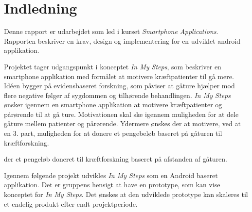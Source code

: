 \thispagestyle{fancy}
\chapter{Indledning}
\label{chp:indledning}

Denne rapport er udarbejdet som led i kurset \emph{Smartphone Applications}. Rapporten beskriver en krav, design og implementering for en udviklet android applikation.

Projektet tager udgangspunkt i konceptet \emph{In My Steps}, som beskriver en smartphone applikation med formålet at motivere kræftpatienter til gå mere. Idéen bygger på evidensbaseret forskning, som påviser at gåture hjælper mod flere negative følger af sygdommen og tilhørende behandlingen. 
\emph{In My Steps} ønsker igennem en smartphone applikation at motivere kræftpatienter og pårørende til at gå ture. Motivationen skal ske igennem muligheden for at dele gåture mellem patienter og pårørende. Ydermere ønskes der at motivere, ved at en 3. part, muligheden for at donere et pengebeløb baseret på gåturen til kræftforskning.

der et pengeløb doneret til kræftforskning baseret på afstanden af gåturen.

Igennem følgende projekt udvikles \emph{In My Steps} som en Android baseret applikation. Det er gruppens hensigt at have en prototype, som kan vise konceptet for \emph{In My Steps}. Det ønskes at den udviklede prototype kan skaleres til et endelig produkt efter endt projektperiode.

